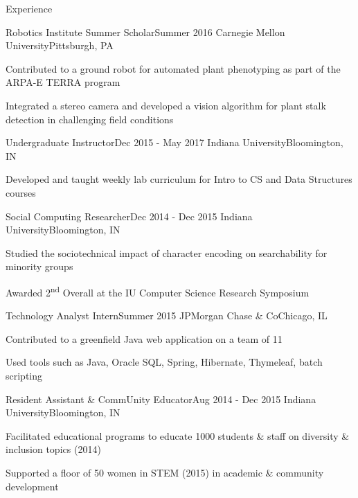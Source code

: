 \documentclass{resume} %
\begin{document}
\begin{rSection}{Experience}

	\begin{rSubsection}{Robotics Institute Summer Scholar}{Summer 2016}
	{Carnegie Mellon University}{Pittsburgh, PA}
	\item Contributed to a ground robot for automated plant phenotyping as part of the ARPA-E TERRA program
	\item Integrated a stereo camera and developed a vision algorithm for plant stalk detection in challenging field conditions
	\end{rSubsection}

	\begin{rSubsection}{Undergraduate Instructor}{Dec 2015 - May 2017}
	{Indiana University}{Bloomington, IN }
	\item Developed and taught weekly lab curriculum for Intro to CS and Data Structures courses 
	\end{rSubsection}

	\begin{rSubsection}{Social Computing Researcher}{Dec 2014 - Dec 2015}
	{Indiana University}{Bloomington, IN }
	\item Studied the sociotechnical impact of character encoding on searchability for minority groups
	\item Awarded 2\textsuperscript{nd} Overall at the IU Computer Science Research Symposium
	\end{rSubsection}

	\begin{rSubsection}{Technology Analyst Intern}{Summer 2015}
	{JPMorgan Chase \& Co}{Chicago, IL}
	\item Contributed to a greenfield Java web application on a team of 11
	\item Used tools such as Java, Oracle SQL, Spring, Hibernate, Thymeleaf, batch scripting
	\end{rSubsection}

	\begin{rSubsection}{Resident Assistant \& CommUnity Educator}{Aug 2014 - Dec 2015}
	{Indiana University}{Bloomington, IN }
	\item Facilitated educational programs to educate 1000 students \& staff on diversity \& inclusion topics (2014)
	\item Supported a floor of 50 women in STEM (2015) in academic \& community development 
	\end{rSubsection}

\end{rSection}	
	
\end{document}
